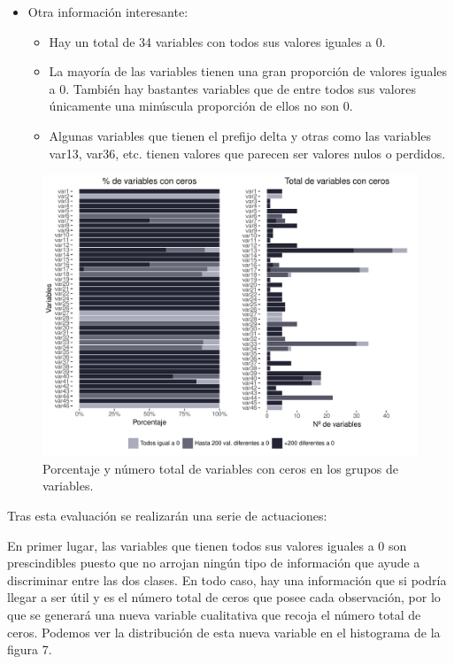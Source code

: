 \documentclass[11pt,a4paper,spanish]{article} %
\begin{document}
\begin{itemize}
    \item{Otra información interesante:}

  \begin{itemize}
      \item{Hay un total de 34 variables con todos sus valores iguales a 0.}
      
      \item{La mayoría de las variables tienen una gran proporción de valores iguales a 0. También hay bastantes variables que de entre todos sus valores únicamente una minúscula proporción de ellos no son 0.}
      
      \item{Algunas variables que tienen el prefijo delta y otras como las variables var13, var36, etc. tienen valores que parecen ser valores nulos o perdidos.}
      
    \end{itemize}
    
\end{itemize}

\begin{figure}[h!]
	\begin{center}
	\includegraphics[width=\textwidth]{Z_01_06_Grafico_ceros_variables.pdf}
    \caption{Porcentaje y número total de variables con ceros en los grupos de variables.}
    \end{center}
\end{figure}


Tras esta evaluación se realizarán una serie de actuaciones:

En primer lugar, las variables que tienen todos sus valores iguales a 0 son prescindibles puesto que no arrojan ningún tipo de información que ayude a discriminar entre las dos clases. En todo caso, hay una información que si podría llegar a ser útil y es el número total de ceros que posee cada observación, por lo que se generará una nueva variable cualitativa que recoja el número total de ceros. Podemos ver la distribución de esta nueva variable en el histograma de la figura 7.
\end{document}
